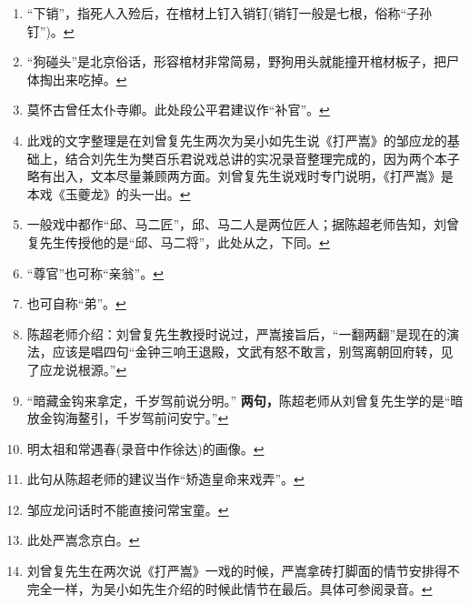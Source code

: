 \begin{enumerate}
\item
  \leavevmode\hypertarget{fn582}{}%
  ``下销''，指死人入殓后，在棺材上钉入销钉(销钉一般是七根，俗称``子孙钉'')。\protect\hyperlink{fnref582}{↩}
\item
  \leavevmode\hypertarget{fn583}{}%
  ``狗碰头''是北京俗话，形容棺材非常简易，野狗用头就能撞开棺材板子，把尸体掏出来吃掉。\protect\hyperlink{fnref583}{↩}
\item
  \leavevmode\hypertarget{fn584}{}%
  莫怀古曾任太仆寺卿。此处段公平君建议作``补官''。\protect\hyperlink{fnref584}{↩}
\item
  \leavevmode\hypertarget{fn585}{}%
  此戏的文字整理是在刘曾复先生两次为吴小如先生说《打严嵩》的邹应龙的基础上，结合刘先生为樊百乐君说戏总讲的实况录音整理完成的，因为两个本子略有出入，文本尽量兼顾两方面。刘曾复先生说戏时专门说明，《打严嵩》是本戏《玉夔龙》的头一出。\protect\hyperlink{fnref585}{↩}
\item
  \leavevmode\hypertarget{fn586}{}%
  一般戏中都作``邱、马二匠''，邱、马二人是两位匠人；据陈超老师告知，刘曾复先生传授他的是``邱、马二将''，此处从之，下同。\protect\hyperlink{fnref586}{↩}
\item
  \leavevmode\hypertarget{fn587}{}%
  ``尊官''也可称``亲翁''。\protect\hyperlink{fnref587}{↩}
\item
  \leavevmode\hypertarget{fn588}{}%
  也可自称``弟''。\protect\hyperlink{fnref588}{↩}
\item
  \leavevmode\hypertarget{fn589}{}%
  陈超老师介绍：刘曾复先生教授时说过，严嵩接旨后，``一翻两翻''是现在的演法，应该是唱四句``金钟三响王退殿，文武有怒不敢言，别驾离朝回府转，见了应龙说根源。''\protect\hyperlink{fnref589}{↩}
\item
  \leavevmode\hypertarget{fn590}{}%
  ``暗藏金钩来拿定，千岁驾前说分明。''
  \textbf{两句，}陈超老师从刘曾复先生学的是``暗放金钩海鳌引，千岁驾前问安宁。''\protect\hyperlink{fnref590}{↩}
\item
  \leavevmode\hypertarget{fn591}{}%
  明太祖和常遇春(录音中作徐达)的画像。\protect\hyperlink{fnref591}{↩}
\item
  \leavevmode\hypertarget{fn592}{}%
  此句从陈超老师的建议当作``矫造皇命来戏弄''。\protect\hyperlink{fnref592}{↩}
\item
  \leavevmode\hypertarget{fn593}{}%
  邹应龙问话时不能直接问常宝童。\protect\hyperlink{fnref593}{↩}
\item
  \leavevmode\hypertarget{fn594}{}%
  此处严嵩念京白。\protect\hyperlink{fnref594}{↩}
\item
  \leavevmode\hypertarget{fn595}{}%
  刘曾复先生在两次说《打严嵩》一戏的时候，严嵩拿砖打脚面的情节安排得不完全一样，为吴小如先生介绍的时候此情节在最后。具体可参阅录音。\protect\hyperlink{fnref595}{↩}

\end{enumerate}
